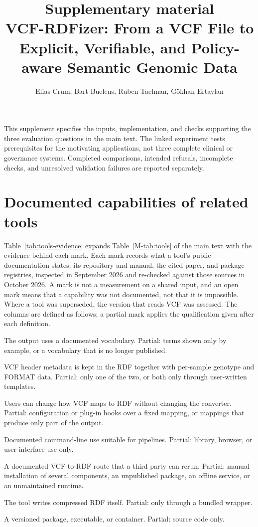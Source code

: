 \documentclass[11pt]{article}
\title{Supplementary material\\[4pt]\large VCF-RDFizer: From a VCF File to Explicit, Verifiable, and Policy-aware Semantic Genomic Data}
\author{Elias Crum, Bart Buelens, Ruben Taelman, G\"okhan Ertaylan}
\date{}
\begin{document}
\maketitle
\noindent This supplement specifies the inputs, implementation, and checks supporting the three evaluation questions in the main text.
The linked experiment tests prerequisites for the motivating applications, not three complete clinical or governance systems.
Completed comparisons, intended refusals, incomplete checks, and unresolved validation failures are reported separately.
\tableofcontents
\clearpage

\section{Documented capabilities of related tools}\label{sec:tools}
Table~\ref{tab:tools-evidence} expands Table~\ref{M-tab:tools} of the main text with the evidence behind each mark.
Each mark records what a tool's public documentation states: its repository and manual, the cited paper, and package registries, inspected in September 2026 and re-checked against those sources in October 2026.
A mark is not a measurement on a shared input, and an open mark means that a capability was not documented, not that it is impossible.
Where a tool was superseded, the version that reads VCF was assessed.
The columns are defined as follows; a partial mark applies the qualification given after each definition.
\begin{description}\setlength{\itemsep}{1pt}
\item[RDF model] The output uses a documented vocabulary. Partial: terms shown only by example, or a vocabulary that is no longer published.
\item[Header + genotype] VCF header metadata is kept in the RDF together with per-sample genotype and FORMAT data. Partial: only one of the two, or both only through user-written templates.
\item[Editable mappings] Users can change how VCF maps to RDF without changing the converter. Partial: configuration or plug-in hooks over a fixed mapping, or mappings that produce only part of the output.
\item[CLI] Documented command-line use suitable for pipelines. Partial: library, browser, or user-interface use only.
\item[Reproducible workflow] A documented VCF-to-RDF route that a third party can rerun. Partial: manual installation of several components, an unpublished package, an offline service, or an unmaintained runtime.
\item[Compressed RDF] The tool writes compressed RDF itself. Partial: only through a bundled wrapper.
\item[Public release] A versioned package, executable, or container. Partial: source code only.
\end{description}
\end{document}
